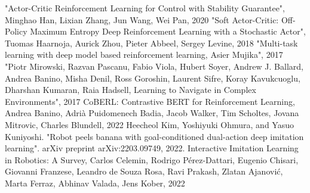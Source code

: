 \documentclass[a4j, twocolumn, 10pt,pdflatex,ja=standard]{bxjsarticle}
\begin{document}
\begin{thebibliography}{99H}
 "Actor-Critic Reinforcement Learning for Control with Stability Guarantee", Minghao Han, Lixian Zhang, Jun Wang, Wei Pan, 2020
 "Soft Actor-Critic: Off-Policy Maximum Entropy Deep Reinforcement Learning with a Stochastic Actor", Tuomas Haarnoja, Aurick Zhou, Pieter Abbeel, Sergey Levine, 2018
 "Multi-task learning with deep model based reinforcement learning, Asier Mujika", 2017
 "Piotr Mirowski, Razvan Pascanu, Fabio Viola, Hubert Soyer, Andrew J. Ballard, Andrea Banino, Misha Denil, Ross Goroshin, Laurent Sifre, Koray Kavukcuoglu, Dharshan Kumaran, Raia Hadsell, Learning to Navigate in Complex Environments", 2017
 CoBERL: Contrastive BERT for Reinforcement Learning, Andrea Banino, Adrià Puidomenech Badia, Jacob Walker, Tim Scholtes, Jovana Mitrovic, Charles Blundell, 2022
 Heecheol Kim, Yoshiyuki Ohmura, and Yasuo Kuniyoshi. "Robot peels banana with goal-conditioned dual-action deep imitation learning". arXiv preprint arXiv:2203.09749, 2022.
Interactive Imitation Learning in Robotics: A Survey, Carlos Celemin, Rodrigo Pérez-Dattari, Eugenio Chisari, Giovanni Franzese, Leandro de Souza Rosa, Ravi Prakash, Zlatan Ajanović, Marta Ferraz, Abhinav Valada, Jens Kober, 2022

\end{thebibliography}
\end{document}
